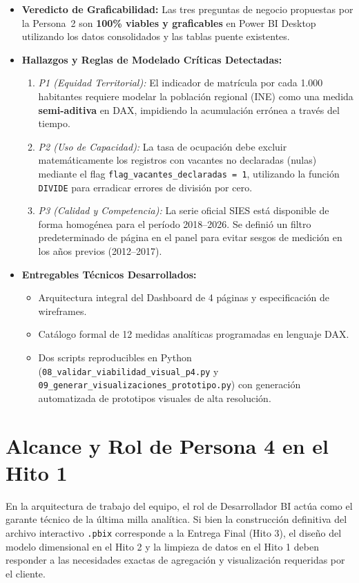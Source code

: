 \documentclass[11pt,a4paper]{article}
\begin{document}
\begin{tcolorbox}[colback=white, colframe=accentteal, title=\textbf{Cuadro Resumen de la Auditoría Técnica (Persona 4)}]
\begin{itemize}
    \item \textbf{Veredicto de Graficabilidad:} Las tres preguntas de negocio propuestas por la Persona~2 son \textbf{100\% viables y graficables} en Power BI Desktop utilizando los datos consolidados y las tablas puente existentes.
    \item \textbf{Hallazgos y Reglas de Modelado Críticas Detectadas:}
    \begin{enumerate}
        \item \emph{P1 (Equidad Territorial):} El indicador de matrícula por cada 1.000 habitantes requiere modelar la población regional (INE) como una medida \textbf{semi-aditiva} en DAX, impidiendo la acumulación errónea a través del tiempo.
        \item \emph{P2 (Uso de Capacidad):} La tasa de ocupación debe excluir matemáticamente los registros con vacantes no declaradas (nulas) mediante el flag \texttt{flag\_vacantes\_declaradas = 1}, utilizando la función \texttt{DIVIDE} para erradicar errores de división por cero.
        \item \emph{P3 (Calidad y Competencia):} La serie oficial SIES está disponible de forma homogénea para el período 2018--2026. Se definió un filtro predeterminado de página en el panel para evitar sesgos de medición en los años previos (2012--2017).
    \end{enumerate}
    \item \textbf{Entregables Técnicos Desarrollados:}
    \begin{itemize}
        \item Arquitectura integral del Dashboard de 4 páginas y especificación de wireframes.
        \item Catálogo formal de 12 medidas analíticas programadas en lenguaje DAX.
        \item Dos scripts reproducibles en Python (\texttt{08\_validar\_viabilidad\_visual\_p4.py} y \texttt{09\_generar\_visualizaciones\_prototipo.py}) con generación automatizada de prototipos visuales de alta resolución.
    \end{itemize}
\end{itemize}
\end{tcolorbox}

\section{Alcance y Rol de Persona 4 en el Hito 1}
En la arquitectura de trabajo del equipo, el rol de Desarrollador BI actúa como el garante técnico de la última milla analítica. Si bien la construcción definitiva del archivo interactivo \texttt{.pbix} corresponde a la Entrega Final (Hito 3), el diseño del modelo dimensional en el Hito 2 y la limpieza de datos en el Hito 1 deben responder a las necesidades exactas de agregación y visualización requeridas por el cliente.
\end{document}
